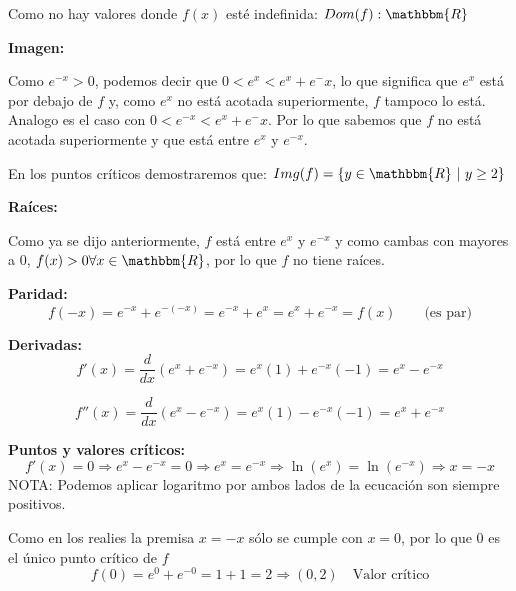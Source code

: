 \documentclass[12pt]{article}
\begin{document}
\begin{enumerate}[\hspace{9px} a)]
            Como no hay valores donde $f(x)$ est\'e indefinida: \(Dom(f):\mathbbm{R}\)\medskip

        \textbf{Imagen: }\medskip

            Como \(e^{-x}>0\), podemos decir que \(0<e^x<e^x+e^-x\), lo que significa que \(e^x\) est\'a por debajo de \(f\) y, como \(e^x\) no est\'a acotada superiormente, \(f\) tampoco lo est\'a. Analogo es el caso con \(0<e^{-x}<e^x+e^-x\). Por lo que sabemos que \(f\) no est\'a acotada superiormente y que est\'a entre \(e^x\) y \(e^{-x}\).\medskip

            En los puntos cr\'iticos demostraremos que: \(Img(f)=\{y\in\mathbbm{R} \ | \ y\geq2\}\)\medskip

        \textbf{Ra\'ices: }\medskip

            Como ya se dijo anteriormente, \(f\) est\'a entre \(e^x\) y \(e^{-x}\) y como cambas con mayores a 0, \(f(x)>0 \forall x \in \mathbbm{R}\), por lo que \(f\) no tiene ra\'ices.\medskip

        \textbf{Paridad: }
            \begin{equation*}
                f(-x) = e^{-x}+e^{-(-x)} = e^{-x}+e^x = e^x+e^{-x} = f(x) \qquad \text{(es par)}
            \end{equation*}

        \textbf{Derivadas: }
            \begin{equation*}
                f'(x) = \frac{d}{dx}\left(e^x+e^{-x}\right) = e^x(1)+e^{-x}(-1) = e^x-e^{-x}
            \end{equation*}

            \begin{equation*}
                f''(x) = \frac{d}{dx}\left(e^x-e^{-x}\right) = e^x(1)-e^{-x}(-1) = e^x+e^{-x}
            \end{equation*}

        \textbf{Puntos y valores cr\'iticos: }
            \begin{equation*}
                f'(x)=0 \Rightarrow e^x-e^{-x}=0 \Rightarrow e^x=e^{-x} \Rightarrow \ln(e^x)=\ln(e^{-x}) \Rightarrow x=-x
            \end{equation*}
            NOTA: Podemos aplicar logaritmo por ambos lados de la ecucaci\'on son siempre positivos.\medskip

            Como en los realies la premisa \(x = -x\) s\'olo se cumple con \(x=0\), por lo que 0 es el \'unico punto cr\'itico de \(f\)
            \begin{equation*}
                f(0)=e^0+e^{-0}=1+1=2 \Longrightarrow (0,2) \quad \text{Valor crítico}
            \end{equation*}


\end{enumerate}
\end{document}
